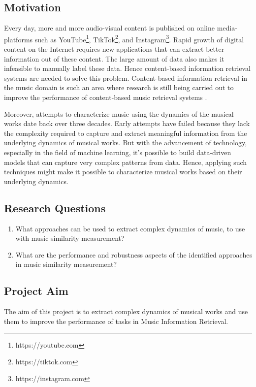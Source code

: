 \documentclass[../main.tex]{subfiles}
\begin{document}
\newpage
\subsection{Motivation}

\par
Every day, more and more audio-visual content is published on online media-platforms such as YouTube\footnote{https://youtube.com}, TikTok\footnote{https://tiktok.com}, and Instagram\footnote{https://instagram.com}. Rapid growth of digital content on the Internet requires new applications that can extract better information out of these content. The large amount of data also makes it infeasible to manually label these data. Hence content-based information retrieval systems are needed to solve this problem. Content-based information retrieval in the music domain is such an area where research is still being carried out to improve the performance of content-based music retrieval systems \cite{yesilerInvestigatingEfficacyMusic2021,jiang_yang_chen_2020,yu_contrastive_2020}.

\par
Moreover, attempts to characterize music using the dynamics of the musical works date back over three decades. Early attempts have failed because they lack the complexity required to capture and extract meaningful information from the underlying dynamics of musical works. But with the advancement of technology, especially in the field of machine learning, it's possible to build data-driven models that can capture very complex patterns from data. Hence, applying such techniques might make it possible to characterize musical works based on their underlying dynamics.


\subsection{Research Questions}

\normalsize
\begin{enumerate}
  \item What approaches can be used to extract complex dynamics of music, to use with music similarity measurement?
  \item What are the performance and robustness aspects of the identified approaches in music similarity measurement?
\end{enumerate}

\subsection{Project Aim}
The aim of this project is to extract complex dynamics of musical works and use them to improve the performance of tasks in Music Information Retrieval.
\end{document}
